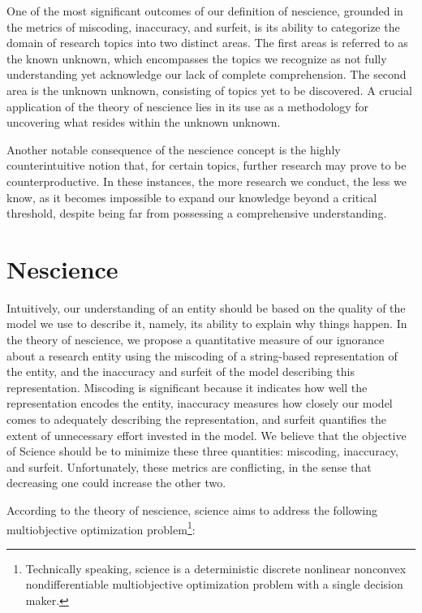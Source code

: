One of the most significant outcomes of our definition of nescience, grounded in the metrics of miscoding, inaccuracy, and surfeit, is its ability to categorize the domain of research topics into two distinct areas. The first areas is referred to as the known unknown, which encompasses the topics we recognize as not fully understanding yet acknowledge our lack of complete comprehension. The second area is the unknown unknown, consisting of topics yet to be discovered. A crucial application of the theory of nescience lies in its use as a methodology for uncovering what resides within the unknown unknown.

Another notable consequence of the nescience concept is the highly counterintuitive notion that, for certain topics, further research may prove to be counterproductive. In these instances, the more research we conduct, the less we know, as it becomes impossible to expand our knowledge beyond a critical threshold, despite being far from possessing a comprehensive understanding.

%
%

\section{Nescience}

Intuitively, our understanding of an entity should be based on the quality of the model we use to describe it, namely, its ability to explain why things happen. In the theory of nescience, we propose a quantitative measure of our ignorance about a research entity using the miscoding of a string-based representation of the entity, and the inaccuracy and surfeit of the model describing this representation. Miscoding is significant because it indicates how well the representation encodes the entity, inaccuracy measures how closely our model comes to adequately describing the representation, and surfeit quantifies the extent of unnecessary effort invested in the model. We believe that the objective of Science should be to minimize these three quantities: miscoding, inaccuracy, and surfeit. Unfortunately, these metrics are conflicting, in the sense that decreasing one could increase the other two.

According to the theory of nescience, science aims to address the following multiobjective optimization problem\footnote{Technically speaking, science is a deterministic discrete nonlinear nonconvex nondifferentiable multiobjective optimization problem with a single decision maker.}:

